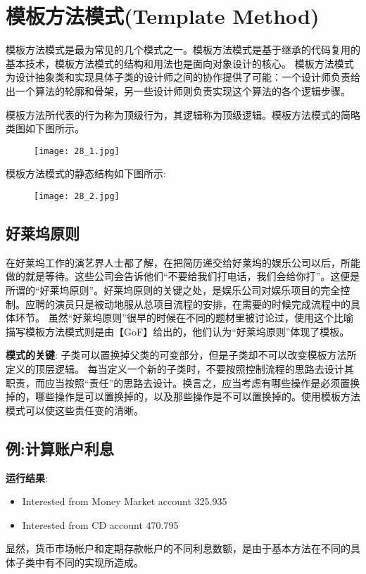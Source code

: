 \documentclass[../main.tex]{subfiles}
\begin{document}
\section{模板方法模式(Template Method)}
模板方法模式是最为常见的几个模式之一。模板方法模式是基于继承的代码复用的基本技术，模板方法模式的结构和用法也是面向对象设计的核心。
模板方法模式为设计抽象类和实现具体子类的设计师之间的协作提供了可能：一个设计师负责给出一个算法的轮廓和骨架，另一些设计师则负责实现这个算法的各个逻辑步骤。

模板方法所代表的行为称为顶级行为，其逻辑称为顶级逻辑。模板方法模式的简略类图如下图所示。
%
\begin{figure}[H]
  \texttt{[image: 28\_1.jpg]}
\end{figure}
%
模板方法模式的静态结构如下图所示:
%
\begin{figure}[H]
  \texttt{[image: 28\_2.jpg]}
\end{figure}
%


%
\subsection{好莱坞原则}
在好莱坞工作的演艺界人士都了解，在把简历递交给好莱坞的娱乐公司以后，所能做的就是等待。这些公司会告诉他们“不要给我们打电话，我们会给你打”。这便是所谓的“好莱坞原则”。好莱坞原则的关键之处，是娱乐公司对娱乐项目的完全控制。应聘的演员只是被动地服从总项目流程的安排，在需要的时候完成流程中的具体环节。
虽然“好莱坞原则”很早的时候在不同的题材里被讨论过，使用这个比喻描写模板方法模式则是由【GoF】给出的，他们认为“好莱坞原则”体现了模板。

\textbf{模式的关键}:
子类可以置换掉父类的可变部分，但是子类却不可以改变模板方法所定义的顶层逻辑。
每当定义一个新的子类时，不要按照控制流程的思路去设计其职责，而应当按照“责任”的思路去设计。换言之，应当考虑有哪些操作是必须置换掉的，哪些操作是可以置换掉的，以及那些操作是不可以置换掉的。使用模板方法模式可以使这些责任变的清晰。
%
\subsection{例:计算账户利息}




%
\textbf{运行结果}:
%
\begin{itemize}
  \item Interested from Money Market account 325.935
  \item Interested from CD account 470.795
\end{itemize}
%
显然，货币市场帐户和定期存款帐户的不同利息数额，是由于基本方法在不同的具体子类中有不同的实现所造成。
%
\end{document}
